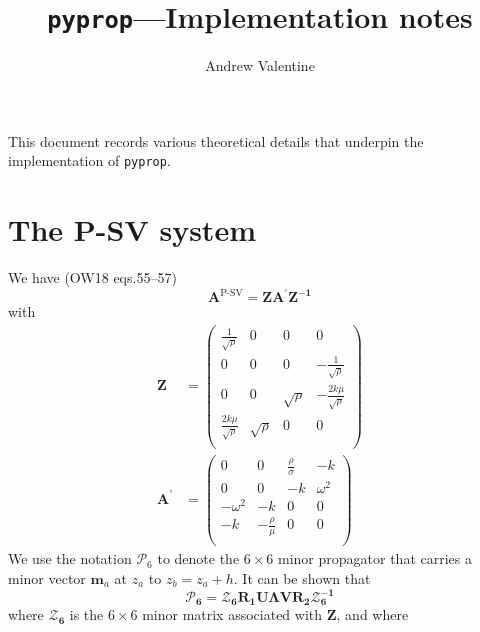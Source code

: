 \documentclass[a4paper,10pt]{article}
\title{\texttt{pyprop}---Implementation notes}
\author{Andrew Valentine}
\begin{document}
\maketitle
This document records various theoretical details that underpin the implementation of \texttt{pyprop}.

\section{The P-SV system}
We have (OW18 eqs.55--57)
\begin{equation}
\mathbf{A}^\textrm{P-SV} = \mathbf{Z A^\prime Z^{-1}}
\end{equation}
with
\begin{align}
\mathbf{Z}& =\left(
\begin{array}{cccc}
 \frac{1}{\sqrt{\rho }} & 0 & 0 & 0 \\
 0 & 0 & 0 & -\frac{1}{\sqrt{\rho }} \\
 0 & 0 & \sqrt{\rho } & -\frac{2 k \mu }{\sqrt{\rho }} \\
 \frac{2 k \mu }{\sqrt{\rho }} & \sqrt{\rho } & 0 & 0 \\
\end{array}
\right)\\
\mathbf{A^\prime}&=\left(
\begin{array}{cccc}
 0 & 0 & \frac{\rho }{\sigma } & -k \\
 0 & 0 & -k & \omega ^2 \\
 -\omega ^2 & -k & 0 & 0 \\
 -k & -\frac{\rho }{\mu } & 0 & 0 \\
\end{array}
\right)
\end{align}
We use the notation $\mathcal{P}_6$ to denote the $6\times 6$ minor propagator that carries a minor vector $\mathbf{m}_a$ at $z_a$ to $z_b=z_a+h$. It can be shown that
\begin{equation}
\boldsymbol{\mathcal{P}_6} = \boldsymbol{\mathcal{Z}_6} \mathbf{R_1 U}\boldsymbol{\Lambda}\mathbf{V R_2}\boldsymbol{\mathcal{Z}}^\mathbf{-1}_\mathbf{6}
\end{equation}
where $\boldsymbol{\mathcal{Z}_6}$ is the $6\times 6$ minor matrix associated with $\mathbf{Z}$, and where
\end{document}

